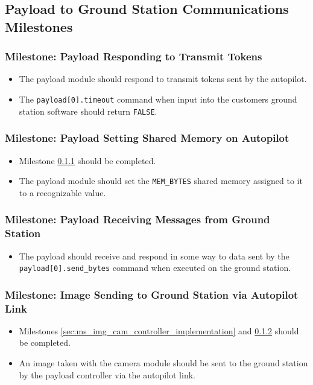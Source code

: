 \subsection{Payload to Ground Station Communications Milestones}
	\subsubsection{Milestone: Payload Responding to Transmit Tokens}
		\label{sec:ms_pl_tx_token_resp}
		\begin{itemize}
			\item 	The payload module should respond to transmit tokens
				sent by the autopilot. 
			\item 	The \verb+payload[0].timeout+ command when input into
				the customers ground station software should return 
				\verb+FALSE+.
		\end{itemize}

	\subsubsection{Milestone: Payload Setting Shared Memory on Autopilot}
		\label{sec:ms_pl_shared_mem_set}
		\begin{itemize}
			\item 	Milestone \ref{sec:ms_pl_tx_token_resp}
				should be completed.
			\item 	The payload module should set the \verb+MEM_BYTES+ 
				shared memory assigned to it to a recognizable value.
		\end{itemize}

	\subsubsection{Milestone: Payload Receiving Messages from Ground Station}
		\label{sec:ms_pl_rx_msg_gs}
		\begin{itemize}
			\item 	The payload should receive and respond in some way to 
				data sent by the \verb+payload[0].send_bytes+ command
				when executed on the ground station.
		\end{itemize}

	\subsubsection{Milestone: Image Sending to Ground Station via Autopilot Link}
		\label{sec:ms_pl_img_sending_gs}
		\begin{itemize}
			\item 	Milestones \ref{sec:ms_img_cam_controller_implementation} and \ref{sec:ms_pl_shared_mem_set}
				should be completed.
			\item 	An image taken with the camera module should be sent to the
				ground station by the payload controller via the autopilot link.
		\end{itemize}


